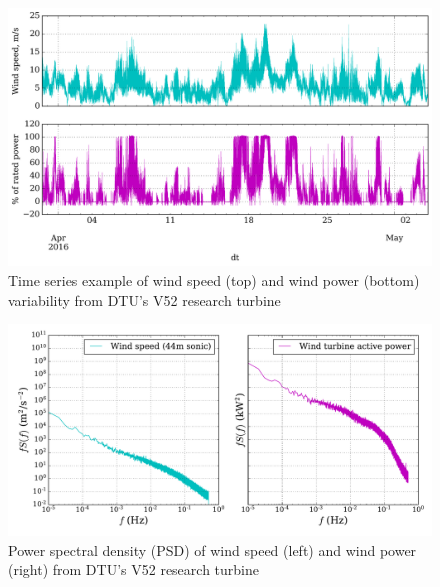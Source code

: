 \begin{figure}[htbp]
    \centering
        \includegraphics[width=1.0\textwidth]{graphics/intro/variability/wind_speed_power_ts.png}
    \caption{Time series example of wind speed (top) and wind power (bottom) variability from DTU's V52 research turbine}
    \label{fig:wind_speed_power_ts}
\end{figure}

\begin{figure}[htbp]
    \centering
        \includegraphics[width=1.0\textwidth]{graphics/intro/variability/wind_speed_power_psd.pdf}
    \caption{Power spectral density (PSD) of wind speed (left) and wind power (right) from DTU's V52 research turbine}
    \label{fig:wind_speed_power_psd}
\end{figure}



